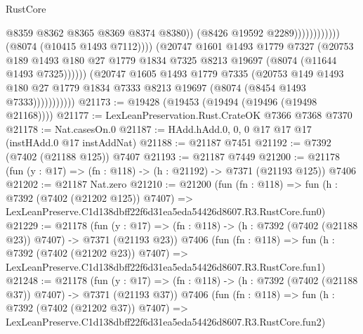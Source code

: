 \begin{lexlean}{RustCore}
\begin{coremodule}
                                                    @8359
                                                    @8362
                                                    @8365
                                                    @8369
                                                    @8374
                                                    @8380))
                                                (@8426 @19592 @2289))))))))))))
                          (@8074 (@10415 @1493 @7112))))
                      (@20747
                        @1601
                        @1493
                        @1779
                        @7327
                        (@20753
                          @189
                          @1493
                          @180
                          @27
                          @1779
                          @1834
                          @7325
                          @8213
                          @19697
                          (@8074 (@11644 @1493 @7325))))))
                  (@20747
                    @1605
                    @1493
                    @1779
                    @7335
                    (@20753
                      @149
                      @1493
                      @180
                      @27
                      @1779
                      @1834
                      @7333
                      @8213
                      @19697
                      (@8074 (@8454 @1493 @7333)))))))))))
@21173 := @19428 (@19453 (@19494 (@19496 (@19498 @21168))))
@21177 := LexLeanPreservation.Rust.CrateOK @7366 @7368 @7370
@21178 := Nat.casesOn.{0}
@21187 := HAdd.hAdd.{0, 0, 0} @17 @17 @17 (instHAdd.{0} @17 instAddNat)
@21188 := @21187 @7451
@21192 := @7392 (@7402 (@21188 @125)) @7407
@21193 := @21187 @7449
@21200 := @21178 (fun (y : @17) => (fn : @118) -> (h : @21192) -> @7371 (@21193 @125)) @7406
@21202 := @21187 Nat.zero
@21210 := @21200
    (fun (fn : @118) =>
    fun (h : @7392 (@7402 (@21202 @125)) @7407) =>
    LexLeanPreserve.C1d138dbff22f6d31ea5eda54426d8607.R3.RustCore.fun0)
@21229 := @21178
    (fun (y : @17) => (fn : @118) -> (h : @7392 (@7402 (@21188 @23)) @7407) -> @7371 (@21193 @23))
    @7406
    (fun (fn : @118) =>
    fun (h : @7392 (@7402 (@21202 @23)) @7407) =>
    LexLeanPreserve.C1d138dbff22f6d31ea5eda54426d8607.R3.RustCore.fun1)
@21248 := @21178
    (fun (y : @17) => (fn : @118) -> (h : @7392 (@7402 (@21188 @37)) @7407) -> @7371 (@21193 @37))
    @7406
    (fun (fn : @118) =>
    fun (h : @7392 (@7402 (@21202 @37)) @7407) =>
    LexLeanPreserve.C1d138dbff22f6d31ea5eda54426d8607.R3.RustCore.fun2)

\end{coremodule}
\end{lexlean}
